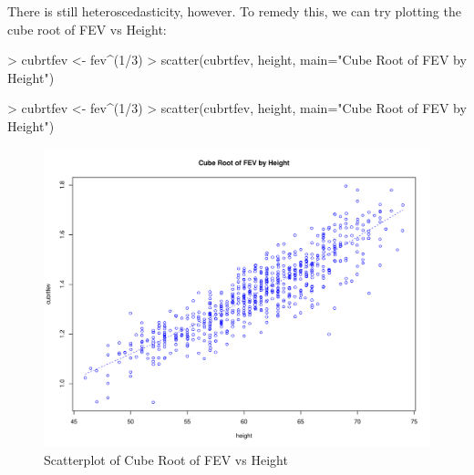\documentclass[landscape]{article}
\renewenvironment{Schunk}{\vspace{\topsep}}{\vspace{\topsep}}
\begin{document}
There is still heteroscedasticity, however. To remedy this, we can try plotting the cube root of FEV vs Height:\\
\begin{Schunk}
\begin{Sinput}
> cubrtfev <- fev^(1/3)
> scatter(cubrtfev, height, main="Cube Root of FEV by Height")
\end{Sinput}
\end{Schunk}
\begin{Schunk}
\begin{Sinput}
> cubrtfev <- fev^(1/3)
> scatter(cubrtfev, height, main="Cube Root of FEV by Height")
\end{Sinput}
\end{Schunk}
\begin{figure}[h]
\centering
\includegraphics[scale=.005]{fevdoc-heightfevscatter4}
\caption{Scatterplot of Cube Root of FEV vs Height}
\label{heightfevscatter4}
\end{figure}
\clearpage
\end{document}
